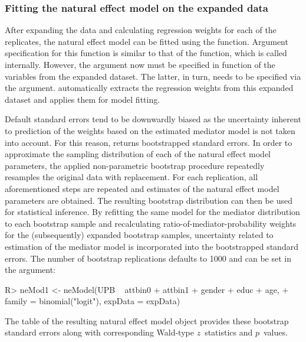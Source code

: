 \documentclass[nojss]{jss}
\begin{document}
\subsubsection[]{Fitting the natural effect model on the expanded data}
After expanding the data and calculating regression weights for each of the replicates, the natural effect model can be fitted using the  function. Argument specification for this function is similar to that of the  function, which is called internally. However, the  argument now must be specified in function of the variables from the expanded dataset. The latter, in turn, needs to be specified via the  argument.  automatically extracts the regression weights from this expanded dataset and applies them for model fitting.
\par Default  standard errors tend to be downwardly biased as the uncertainty inherent to prediction of the weights based on the estimated mediator model is not taken into account. For this reason,  returns bootstrapped standard errors. In order to approximate the sampling distribution of each of the natural effect model parameters, the applied non-parametric bootstrap procedure repeatedly resamples the original data with replacement. For each replication, all aforementioned steps are repeated and estimates of the natural effect model parameters are obtained. The resulting bootstrap distribution can then be used for statistical inference. By refitting the same model for the mediator distribution to each bootstrap sample and recalculating ratio-of-mediator-probability weights for the (subsequently) expanded bootstrap samples, uncertainty related to estimation of the mediator model is incorporated into the bootstrapped standard errors. The number of bootstrap replications defaults to 1000 and can be set in the  argument:
\begin{Schunk}
\begin{Sinput}
R> neMod1 <- neModel(UPB ~ attbin0 + attbin1 + gender + educ + age,
+    family = binomial("logit"), expData = expData)
\end{Sinput}
\end{Schunk}
The  table of the resulting natural effect model object provides these bootstrap standard errors along with corresponding Wald-type $z$~statistics and $p$~values.
\end{document}
